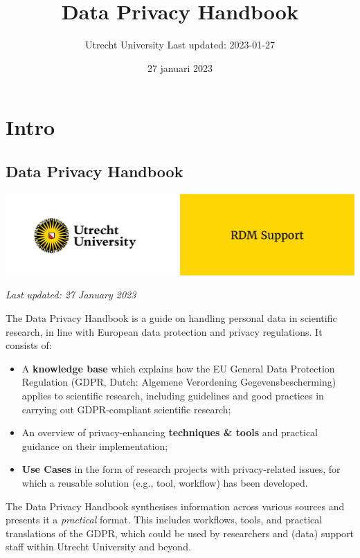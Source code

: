 \documentclass[
]{book}
\title{Data Privacy Handbook}
\author{Utrecht University \textbar{} Last updated: 2023-01-27}
\date{27 januari 2023}
\providecommand{\tightlist}{%
  \setlength{\itemsep}{0pt}\setlength{\parskip}{0pt}}
\begin{document}
\maketitle

{
\setcounter{tocdepth}{1}
\tableofcontents
}
\hypertarget{part-intro}{%
\part*{Intro}\label{part-intro}}

\hypertarget{data-privacy-handbook}{%
\chapter*{Data Privacy Handbook}\label{data-privacy-handbook}}

\includegraphics{img/cover-image-dph.png}

\emph{Last updated: 27 January 2023}

The Data Privacy Handbook is a guide on handling personal data in scientific
research, in line with European data protection and privacy regulations. It
consists of:

\begin{itemize}
\tightlist
\item
  A \textbf{knowledge base} which explains how the EU General Data Protection
  Regulation (GDPR, Dutch: Algemene Verordening Gegevensbescherming) applies to
  scientific research, including guidelines and good practices in carrying out
  GDPR-compliant scientific research;
\item
  An overview of privacy-enhancing \textbf{techniques \& tools} and practical guidance
  on their implementation;
\item
  \textbf{Use Cases} in the form of research projects with privacy-related issues,
  for which a reusable solution (e.g., tool, workflow) has been developed.
\end{itemize}

The Data Privacy Handbook synthesises information across various sources and
presents it a \emph{practical} format. This includes workflows, tools, and practical
translations of the GDPR, which could be used by researchers and (data) support
staff within Utrecht University and beyond.
\end{document}
